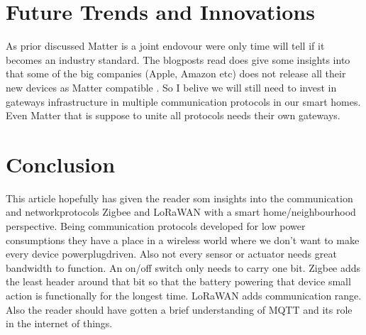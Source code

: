 \documentclass[article,a4paper]{IEEEtran}
\begin{document}
    \section{Future Trends and Innovations}
    As prior discussed Matter is a joint endovour were only time will tell if it becomes an industry standard. The blogposts read does give some insights into that some of the big companies (Apple, Amazon etc) does not release all their new devices as Matter compatible \cite{BlogMatter}. So I belive we will still need to invest in gateways infrastructure in multiple communication protocols in our smart homes. Even Matter that is suppose to unite all protocols needs their own gateways.
    \section{Conclusion}
    This article hopefully has given the reader som insights into the communication and networkprotocols Zigbee and LoRaWAN with a smart home/neighbourhood perspective. Being communication protocols developed for low power consumptions they have a place in a wireless world where we don't want to make every device powerplugdriven. Also not every sensor or actuator needs great bandwidth to function. An on/off switch only needs to carry one bit. Zigbee adds the least header around that bit so that the battery powering that device small action is functionally for the longest time. LoRaWAN adds communication range. Also the reader should have gotten a brief understanding of MQTT and its role in the internet of things.   
\printbibliography
\end{document}

